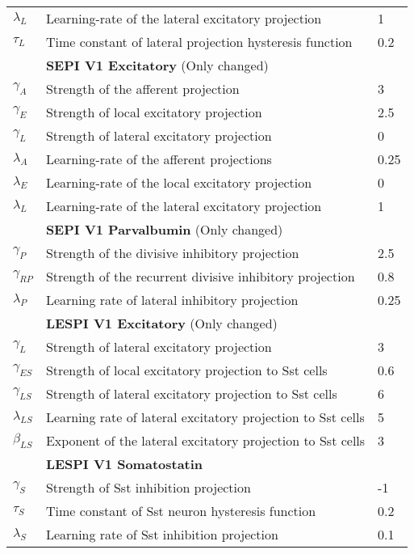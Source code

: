 {\begin{tabular}{ l l l }
	$\lambda_L$ & Learning-rate of the lateral excitatory projection & 1 \\
	$\tau_L$ & Time constant of lateral projection hysteresis function & 0.2 \\
	\ & \textbf{SEPI V1 Excitatory} (Only changed)  & \  \\
	$\gamma_A$ & Strength of the afferent projection & 3 \\
	$\gamma_E$ & Strength of local excitatory projection & 2.5 \\
	$\gamma_L$ & Strength of lateral excitatory projection & 0 \\
	$\lambda_A$ & Learning-rate of the afferent projections & 0.25 \\
	$\lambda_E$ & Learning-rate of the local excitatory projection & 0 \\
	$\lambda_L$ & Learning-rate of the lateral excitatory projection & 1 \\
	\ & \textbf{SEPI V1 Parvalbumin} (Only changed)  & \  \\
	$\gamma_P$ & Strength of the divisive inhibitory projection & 2.5 \\
	$\gamma_{RP}$ & Strength of the recurrent divisive inhibitory projection & 0.8 \\
	$\lambda_P$ & Learning rate of lateral inhibitory projection & 0.25 \\
	\ & \textbf{LESPI V1 Excitatory} (Only changed) & \  \\
	$\gamma_L$ & Strength of lateral excitatory projection & 3 \\
	$\gamma_{ES}$ & Strength of local excitatory projection to Sst cells & 0.6 \\
	$\gamma_{LS}$ & Strength of lateral excitatory projection to Sst cells & 6 \\
	$\lambda_{LS}$ & Learning rate of lateral excitatory projection to Sst cells & 5 \\
	$\beta_{LS}$ & Exponent of the lateral excitatory projection to Sst cells & 3 \\
	\ & \textbf{LESPI V1 Somatostatin} & \  \\
	$\gamma_S$ & Strength of Sst inhibition projection & -1 \\
	$\tau_S$ & Time constant of Sst neuron hysteresis function & 0.2 \\
	$\lambda_S$ & Learning rate of Sst inhibition projection & 0.1 \\
\end{tabular}}
